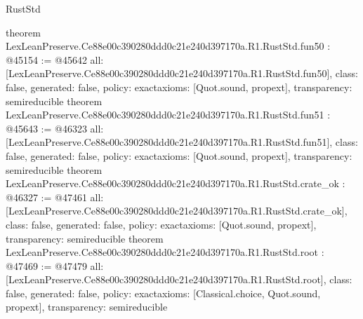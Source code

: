\begin{lexlean}{RustStd}
\begin{coremodule}
{}
theorem LexLeanPreserve.Ce88e00c390280ddd0c21e240d397170a.R1.RustStd.fun50 : @45154 := @45642 {
  all: [LexLeanPreserve.Ce88e00c390280ddd0c21e240d397170a.R1.RustStd.fun50],
  class: false,
  generated: false,
  policy: exact{axioms: [Quot.sound, propext]},
  transparency: semireducible
}
theorem LexLeanPreserve.Ce88e00c390280ddd0c21e240d397170a.R1.RustStd.fun51 : @45643 := @46323 {
  all: [LexLeanPreserve.Ce88e00c390280ddd0c21e240d397170a.R1.RustStd.fun51],
  class: false,
  generated: false,
  policy: exact{axioms: [Quot.sound, propext]},
  transparency: semireducible
}
theorem LexLeanPreserve.Ce88e00c390280ddd0c21e240d397170a.R1.RustStd.crate_ok : @46327 := @47461 {
  all: [LexLeanPreserve.Ce88e00c390280ddd0c21e240d397170a.R1.RustStd.crate_ok],
  class: false,
  generated: false,
  policy: exact{axioms: [Quot.sound, propext]},
  transparency: semireducible
}
theorem LexLeanPreserve.Ce88e00c390280ddd0c21e240d397170a.R1.RustStd.root : @47469 := @47479 {
  all: [LexLeanPreserve.Ce88e00c390280ddd0c21e240d397170a.R1.RustStd.root],
  class: false,
  generated: false,
  policy: exact{axioms: [Classical.choice, Quot.sound, propext]},
  transparency: semireducible
}


\end{coremodule}
\end{lexlean}
